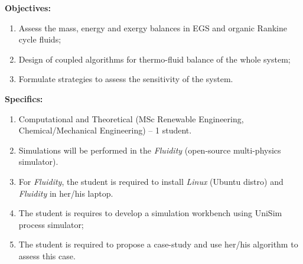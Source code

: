 \documentclass[12pts,a4paper,amsmath,amssymb,floatfix]{article}%
\newcommand{\Renew}{MSc Renewable Engineering, Chemical/Mechanical Engineering}
\begin{document}
\begin{enumerate}[label=\bfseries Project: \arabic*:]
\noindent
{\bf Objectives:}
\begin{enumerate}
\item Assess the mass, energy and exergy balances in EGS and organic Rankine cycle fluids;
\item Design of coupled algorithms for thermo-fluid balance of the whole system;
\item Formulate strategies to assess the sensitivity of the system.%
\end{enumerate}

\noindent
{\bf Specifics:} 
\begin{enumerate}
\item Computational and Theoretical (\Renew) -- 1 student.
\item Simulations will be performed in the {\it Fluidity} (open-source multi-physics simulator). 
\item For {\it Fluidity}, the student is required to install {\it Linux} (Ubuntu distro) and {\it Fluidity} in her/his laptop. 
\item The student is requires to develop a simulation workbench using UniSim process simulator;
\item The student is required to propose a case-study and use her/his algorithm to assess this case.
\end{enumerate}


\end{enumerate}
\end{document}
